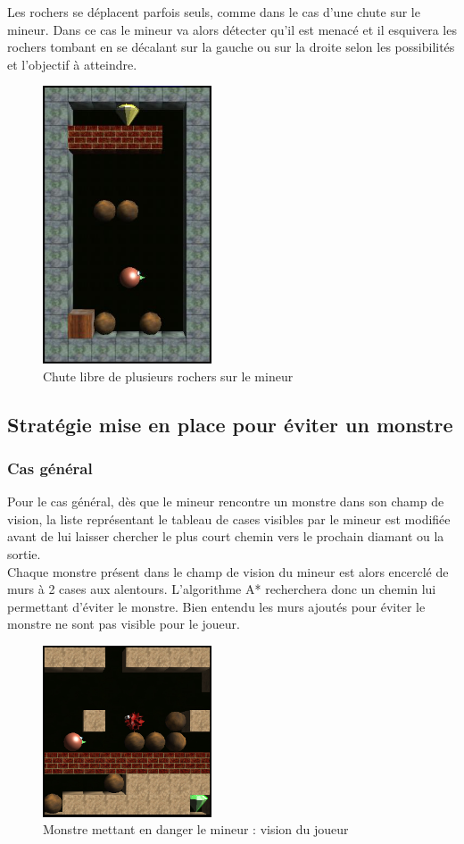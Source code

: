 \documentclass[a4paper,11pt]{article}
\begin{document}
\newpage
Les rochers se déplacent parfois seuls, comme dans le cas d’une chute sur le mineur. Dans ce cas le mineur va alors détecter qu’il est menacé et il esquivera les rochers tombant en se décalant sur la gauche ou sur la droite selon les possibilités et l’objectif à atteindre.

		\begin{figure}[h]
			\center
			\includegraphics[width=5cm]{rochers3}
			\caption{\label{deplacementRocher3} Chute libre de plusieurs rochers sur le mineur}
		\end{figure}
		\clearpage
		
	\newpage
	\subsection{Stratégie mise en place pour éviter un monstre}
	
		\subsubsection{Cas général}
		
		Pour le cas général, dès que le mineur rencontre un monstre dans son champ de vision, la liste représentant le tableau de cases visibles par le mineur est modifiée avant de lui laisser chercher le plus court chemin vers le prochain diamant ou la sortie.\\
Chaque monstre présent dans le champ de vision du mineur est alors encerclé de murs à 2 cases aux alentours. L’algorithme A* recherchera donc un chemin lui permettant d’éviter le monstre. Bien entendu les murs ajoutés pour éviter le monstre ne sont pas visible pour le joueur.

		\begin{figure}[h]
			\center
			\includegraphics[width=5cm]{monstre1}
			\caption{\label{monstre1} Monstre mettant en danger le mineur : vision du joueur}
		\end{figure}
		
\end{document}
